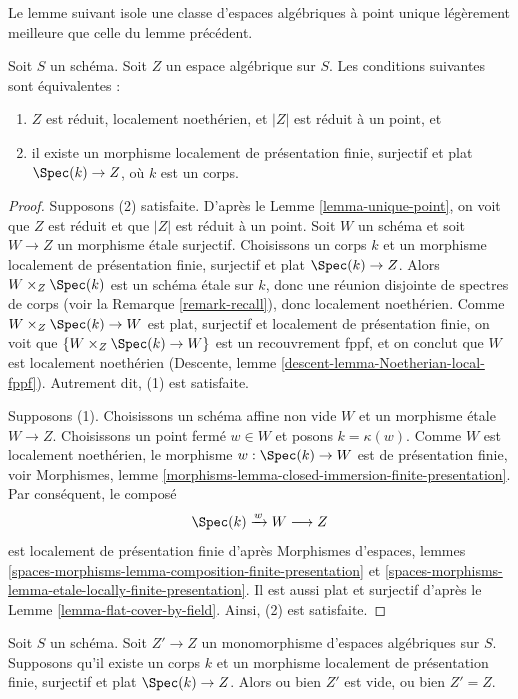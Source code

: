 \noindent
Le lemme suivant isole une classe d'espaces algébriques à point unique
légèrement meilleure que celle du lemme précédent.

\begin{lemma}
\label{lemma-unique-point-better}
Soit $S$ un schéma. Soit $Z$ un espace algébrique sur $S$.
Les conditions suivantes sont équivalentes :
\begin{enumerate}
\item $Z$ est réduit, localement noethérien, et $|Z|$
est réduit à un point, et
\item il existe un morphisme localement de présentation finie, surjectif et
plat $\Spec(k) \to Z$, où $k$ est un corps.
\end{enumerate}
\end{lemma}

\begin{proof}
Supposons (2) satisfaite. D'après le
Lemme \ref{lemma-unique-point},
on voit que $Z$ est réduit et que $|Z|$ est réduit à un point.
Soit $W$ un schéma et soit $W \to Z$ un morphisme \'etale surjectif.
Choisissons un corps $k$ et un morphisme localement de présentation finie,
surjectif et plat $\Spec(k) \to Z$.
Alors $W \times_Z \Spec(k)$ est un schéma
\'etale sur $k$, donc une réunion disjointe de spectres de corps
(voir la Remarque \ref{remark-recall}),
donc localement noethérien. Comme $W \times_Z \Spec(k) \to W$
est plat, surjectif et localement de présentation finie, on voit
que $\{W \times_Z \Spec(k) \to W\}$ est un recouvrement fppf,
et on conclut que $W$ est localement noethérien
(Descente, lemme
\ref{descent-lemma-Noetherian-local-fppf}).
Autrement dit, (1) est satisfaite.

\medskip\noindent
Supposons (1). Choisissons un schéma affine non vide $W$ et un morphisme
\'etale $W \to Z$. Choisissons un point fermé $w \in W$ et posons
$k = \kappa(w)$. Comme $W$ est localement noethérien, le morphisme
$w : \Spec(k) \to W$ est de présentation finie, voir
Morphismes, lemme \ref{morphisms-lemma-closed-immersion-finite-presentation}.
Par conséquent, le composé
$$
\Spec(k) \xrightarrow{w} W \longrightarrow Z
$$
est localement de présentation finie d'après
Morphismes d'espaces, lemmes
\ref{spaces-morphisms-lemma-composition-finite-presentation} et
\ref{spaces-morphisms-lemma-etale-locally-finite-presentation}.
Il est aussi plat et surjectif d'après le
Lemme \ref{lemma-flat-cover-by-field}.
Ainsi, (2) est satisfaite.
\end{proof}

\begin{lemma}
\label{lemma-monomorphism-into-point}
Soit $S$ un schéma.
Soit $Z' \to Z$ un monomorphisme d'espaces algébriques sur $S$.
Supposons qu'il existe un corps $k$ et un morphisme localement de présentation
finie, surjectif et plat $\Spec(k) \to Z$. Alors ou bien $Z'$
est vide, ou bien $Z' = Z$.
\end{lemma}

